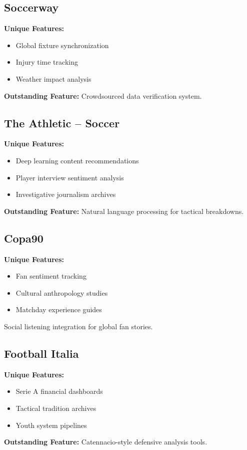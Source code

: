 \documentclass{report}
\begin{document}
\subsection{Soccerway}
\textbf{Unique Features:}
\begin{itemize}
    \item Global fixture synchronization
    \item Injury time tracking
    \item Weather impact analysis
\end{itemize}
\textbf{Outstanding Feature:} Crowdsourced data verification system\citep{soccerway}.

\subsection{The Athletic – Soccer}
\textbf{Unique Features:}
\begin{itemize}
    \item Deep learning content recommendations
    \item Player interview sentiment analysis
    \item Investigative journalism archives
\end{itemize}
\textbf{Outstanding Feature:} Natural language processing for tactical breakdowns\citep{athletic}.

\subsection{Copa90}
\textbf{Unique Features:}
\begin{itemize}
    \item Fan sentiment tracking
    \item Cultural anthropology studies
    \item Matchday experience guides
\end{itemize}
 Social listening integration for global fan stories\citep{copa90}.

\subsection{Football Italia}
\textbf{Unique Features:}
\begin{itemize}
    \item Serie A financial dashboards
    \item Tactical tradition archives
    \item Youth system pipelines
\end{itemize}
\textbf{Outstanding Feature:} Catennacio-style defensive analysis tools\citep{footballitalia}.
\end{document}
